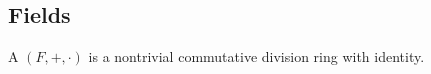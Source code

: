 \subsection{Fields}\label{sec:fields}

\begin{definition}\label{def:field}
  A  \( (F, +, \cdot) \) is a nontrivial commutative division ring with identity.
\end{definition}
